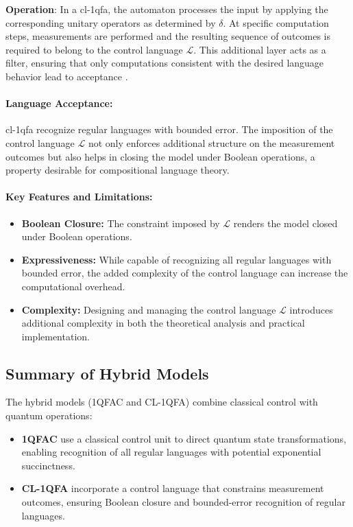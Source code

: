 \textbf{Operation}:  
In a \gls{cl-1qfa}, the automaton processes the input by applying the corresponding unitary operators as determined by \(\delta\). At specific computation steps, measurements are performed and the resulting sequence of outcomes is required to belong to the control language \( \mathcal{L} \). This additional layer acts as a filter, ensuring that only computations consistent with the desired language behavior lead to acceptance \cite{bertoni2003quantum}.

\paragraph{Language Acceptance:}  
\gls{cl-1qfa} recognize regular languages with bounded error. The imposition of the control language \( \mathcal{L} \) not only enforces additional structure on the measurement outcomes but also helps in closing the model under Boolean operations, a property desirable for compositional language theory.

\paragraph{Key Features and Limitations:}
\begin{itemize}
    \item \textbf{Boolean Closure:} The constraint imposed by \( \mathcal{L} \) renders the model closed under Boolean operations.
    \item \textbf{Expressiveness:} While capable of recognizing all regular languages with bounded error, the added complexity of the control language can increase the computational overhead.
    \item \textbf{Complexity:} Designing and managing the control language \( \mathcal{L} \) introduces additional complexity in both the theoretical analysis and practical implementation.
\end{itemize}

\subsection*{Summary of Hybrid Models}
The hybrid models (1QFAC and CL-1QFA) combine classical control with quantum operations:
\begin{itemize}
    \item \textbf{1QFAC} use a classical control unit to direct quantum state transformations, enabling recognition of all regular languages with potential exponential succinctness.
    \item \textbf{CL-1QFA} incorporate a control language that constrains measurement outcomes, ensuring Boolean closure and bounded-error recognition of regular languages.
\end{itemize}

